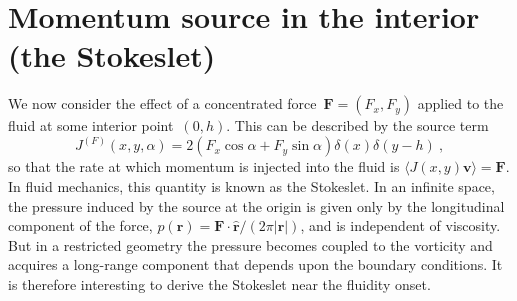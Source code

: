 \documentclass[preprint,aps,eqsecnum, prb]{revtex4-1}
\begin{document}
\section{Momentum source in the interior (the Stokeslet)}
\label{sec:stokeslet}

We now consider the effect of a concentrated force~${\bm F} = (F_x, F_y)$
applied to the fluid at some interior point~$(0, h)$. This can be
described by the source term 
\begin{equation}
  \label{eq:source-force-J}
  J^{(F)}(x, y, \alpha)
  = 2 (F_x \cos\alpha + F_y \sin\alpha) \delta(x) \delta(y - h)
\  , 
\end{equation}
so that the rate at which momentum is injected into the fluid
is $\langle J(x, y) {\bm v}\rangle = {\bm F}$.
In fluid mechanics, this quantity is known as the Stokeslet.
In an infinite space, the pressure induced by the source at the origin
is given only by the longitudinal component of the force, 
$p({\bm r}) = {\bm F} \cdot \widehat{\bm r} / (2\pi |{\bm r}|)$,
and is independent of viscosity. But in a restricted geometry
the pressure becomes coupled to the vorticity and acquires
a long-range component that depends upon the boundary conditions. It is
therefore interesting to derive the Stokeslet near the fluidity onset. 
\end{document}
